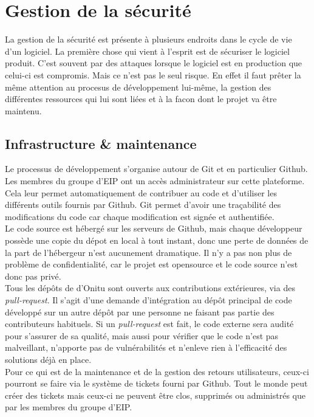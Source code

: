 \section{Gestion de la sécurité}

La gestion de la sécurité est présente à plusieurs endroits dans le cycle de vie d'un logiciel. La première chose qui vient à l'esprit est de sécuriser le logiciel produit. C'est souvent par des attaques lorsque le logiciel est en production que celui-ci est compromis. Mais ce n'est pas le seul risque. En effet il faut prêter la même attention au procesus de développement lui-même, la gestion des différentes ressources qui lui sont liées et à la facon dont le projet va être maintenu.

\subsection{Infrastructure \& maintenance}

Le processus de développement s'organise autour de Git et en particulier Github. Les membres du groupe d'EIP ont un accès administrateur sur cette plateforme. Cela leur permet automatiquement de contribuer au code et d'utiliser les différents outils fournis par Github. Git permet d'avoir une traçabilité des modifications du code car chaque modification est signée et authentifiée.\\

Le code source est hébergé sur les serveurs de Github, mais chaque développeur possède une copie du dépot en local à tout instant, donc une perte de données de la part de l'hébergeur n'est aucunement dramatique. Il n'y a pas non plus de problème de confidentialité, car le projet est opensource et le code source n'est donc pas privé.\\

Tous les dépôts de d'Onitu sont ouverts aux contributions extérieures, via des \textit{pull-request}. Il s'agit d'une demande d'intégration au dépôt principal de code développé sur un autre dépôt par une personne ne faisant pas partie des contributeurs habituels. Si un \textit{pull-request} est fait, le code externe sera audité pour s'assurer de sa qualité, mais aussi pour vérifier que le code n'est pas malveillant, n'apporte pas de vulnérabilités et n'enleve rien à l'efficacité des solutions déjà en place.\\

Pour ce qui est de la maintenance et de la gestion des retours utilisateurs, ceux-ci pourront se faire via le système de tickets fourni par Github. Tout le monde peut créer des tickets mais ceux-ci ne peuvent être clos, supprimés ou administrés que par les membres du groupe d'EIP.

